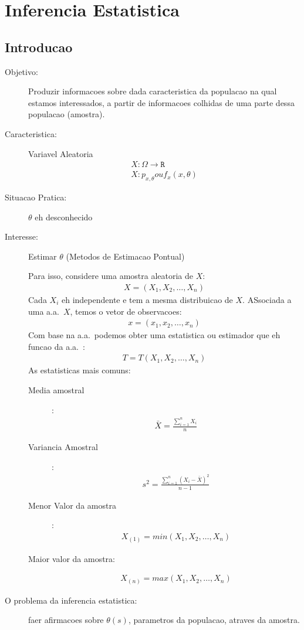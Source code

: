 \chapter{Inferencia Estatistica}
\section{Introducao}
\begin{description}
  \item [Objetivo:]  Produzir informacoes sobre dada caracteristica da populacao na qual estamos 
    interessados, a partir de informacoes colhidas de uma parte dessa populacao (amostra).
  \item[Caracteristica:] Variavel Aleatoria 
    \begin{align}
      X: \Omega \to \mathtt{R} \nonumber \\ 
      X: p_{x,\theta} ou f_{x}(x,\theta)
    \end{align}
  \item [Situacao Pratica:] $\theta$ eh desconhecido
  \item [Interesse:] Estimar $\theta$ (Metodos de Estimacao Pontual)

    Para isso, considere uma amostra aleatoria de $X$:
    \begin{align*}
      X=(X_1,X_2,\ldots,X_n) 
    \end{align*}
    Cada $X_i$ eh independente e tem a mesma distribuicao de $X$. ASsociada a uma a.a.\ $X$, temos o vetor
    de observacoes:
    \begin{align*}
      x=(x_1,x_2,\ldots,x_n) 
    \end{align*}
    Com base na a.a.\ podemos obter uma estatistica ou estimador que eh funcao da a.a.\ :
    \begin{align*}
      T=T(X_1,X_2,\ldots,X_n) 
    \end{align*}
    As estatisticas mais comuns:
    \begin{description}
      \item[Media amostral] :
        \begin{align*}
          \bar{X} = \frac{\sum \limits_{i=1}^{n} X_i}{n}
        \end{align*}
      \item [Variancia Amostral]:
        \begin{align*}
          s^2 = \frac{\sum \limits_{i=1}^{n} \left( X_i - \bar{X}\right)^2}{n-1} 
        \end{align*}
      \item [Menor Valor da amostra]:
        \begin{align*}
          X_{(1)} = min(X_1,X_2,\ldots,X_n)
        \end{align*}
      \item [Maior valor da amostra:]
        \begin{align*}
          X_{(n)} = max(X_1,X_2,\ldots,X_n)
        \end{align*}
    \end{description}
  \item[O problema da inferencia estatistica:] faer afirmacoes sobre $\theta (s)$, parametros da populacao, atraves da amostra.


\end{description}
